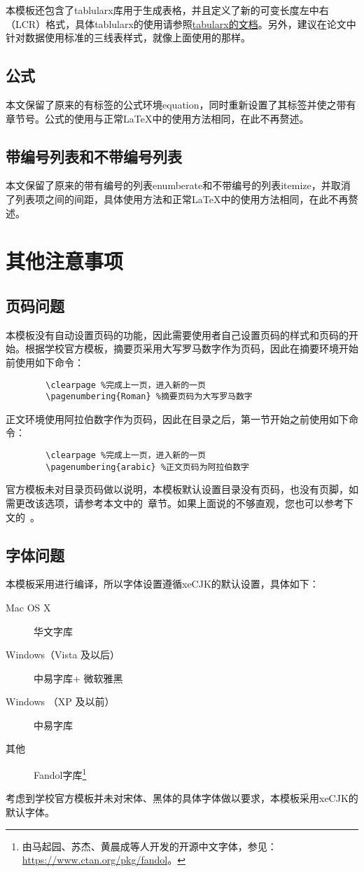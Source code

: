 \documentclass[UTF8]{ctexart}
\begin{document}
	本模板还包含了tablularx库用于生成表格，并且定义了新的可变长度左中右（LCR）格式，具体tablularx的使用请参照\href{http://mirror.lzu.edu.cn/CTAN/macros/latex/required/tools/tabularx.pdf}{tabularx的文档}。另外，建议在论文中针对数据使用标准的三线表样式，就像上面使用的那样。
	
	\subsection{公式}
	本文保留了原来的有标签的公式环境equation，同时重新设置了其标签并使之带有章节号。公式的使用与正常\LaTeX 中的使用方法相同，在此不再赘述。
	
	\subsection{带编号列表和不带编号列表}
	本文保留了原来的带有编号的列表enumberate和不带编号的列表itemize，并取消了列表项之间的间距，具体使用方法和正常\LaTeX 中的使用方法相同，在此不再赘述。
	
	\section{其他注意事项}
	\subsection{页码问题}\label{subsec:pagenum}
	本模板没有自动设置页码的功能，因此需要使用者自己设置页码的样式和页码的开始。根据学校官方模板，摘要页采用大写罗马数字作为页码，因此在摘要环境开始前使用如下命令：
	\begin{verbatim}
		\clearpage %完成上一页，进入新的一页
		\pagenumbering{Roman} %摘要页码为大写罗马数字
	\end{verbatim}
	正文环境使用阿拉伯数字作为页码，因此在目录之后，第一节开始之前使用如下命令：
	\begin{verbatim}
		\clearpage %完成上一页，进入新的一页
		\pagenumbering{arabic} %正文页码为阿拉伯数字
	\end{verbatim}
	官方模板未对目录页码做以说明，本模板默认设置目录没有页码，也没有页脚，如需更改该选项，请参考本文中的~章节。如果上面说的不够直观，您也可以参考下文的~。
	
	\subsection{字体问题}
	本模板采用\XeLaTeX 进行编译，所以字体设置遵循xeCJK的默认设置，具体如下：
	\begin{description}
		\item[Mac OS X] 华文字库
		\item[Windows（Vista 及以后）]中易字库+ 微软雅黑
		\item[Windows （XP 及以前）] 中易字库
		\item[其他] Fandol字库\footnote{由马起园、苏杰、黄晨成等人开发的开源中文字体，参见：\url{https://www.ctan.org/pkg/fandol}。}
	\end{description}\cite[\S 4.3]{ctexdoc}
	考虑到学校官方模板并未对宋体、黑体的具体字体做以要求，本模板采用xeCJK的默认字体。
	
\end{document}
